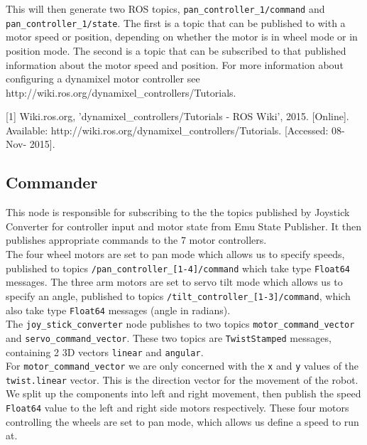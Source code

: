 \documentclass[titlepage,12pt,a4paper]{article}
\begin{document}
\noindent This will then generate two ROS topics, \texttt{pan\_controller\_1/command} and \texttt{pan\_controller\_1/state}. The first is a topic that can be published to with a motor speed or position, depending on whether the motor is in wheel mode or in position mode. The second is a topic that can be subscribed to that published information about the motor speed and position. For more information about configuring a dynamixel motor controller see http://wiki.ros.org/dynamixel\_controllers/Tutorials.

[1] Wiki.ros.org, 'dynamixel\_controllers/Tutorials - ROS Wiki', 2015. [Online]. Available: http://wiki.ros.org/dynamixel\_controllers/Tutorials. [Accessed: 08- Nov- 2015].

\subsection{Commander}
This node is responsible for subscribing to the the topics published by Joystick Converter for controller input and motor state from Emu State Publisher. It then publishes appropriate commands to the 7 motor controllers.\\

\noindent The four wheel motors are set to pan mode which allows us to specify speeds, published to topics \texttt{/pan\_controller\_[1-4]/command} which take type \texttt{Float64} messages. The three arm motors are set to servo tilt mode which allows us to specify an angle, published to topics \texttt{/tilt\_controller\_[1-3]/command}, which also take type \texttt{Float64} messages (angle in radians).\\

\noindent The \texttt{joy\_stick\_converter} node publishes to two topics \texttt{motor\_command\_vector} and \texttt{servo\_command\_vector}. These two topics are \texttt{TwistStamped} messages, containing 2 3D vectors \texttt{linear} and \texttt{angular}.\\

\noindent For \texttt{motor\_command\_vector} we are only concerned with the \texttt{x} and \texttt{y} values of the \texttt{twist.linear} vector. This is the direction vector for the movement of the robot. We split up the components into left and right movement, then publish the speed \texttt{Float64} value to the left and right side motors respectively. These four motors controlling the wheels are set to pan mode, which allows us define a speed to run at.\\
\end{document}
